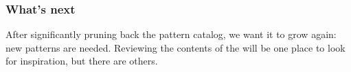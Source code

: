 \subsubsection*{What's next} After significantly pruning back the pattern catalog, we want it to grow again: new patterns are needed.  Reviewing the contents of the  will be one place to look for inspiration, but there are others.


